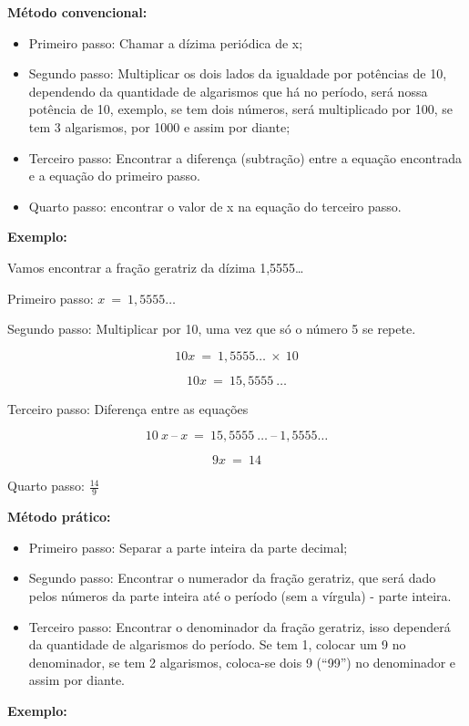 \textbf{Método convencional:}

\begin{itemize}
\item
  Primeiro passo: Chamar a dízima periódica de x;
\item
  Segundo passo: Multiplicar os dois lados da igualdade por potências de
  10, dependendo da quantidade de algarismos que há no período, será
  nossa potência de 10, exemplo, se tem dois números, será multiplicado
  por 100, se tem 3 algarismos, por 1000 e assim por diante;
\item
  Terceiro passo: Encontrar a diferença (subtração) entre a equação
  encontrada e a equação do primeiro passo.
\item
  Quarto passo: encontrar o valor de x na equação do terceiro passo.
\end{itemize}

\textbf{Exemplo:}

Vamos encontrar a fração geratriz da dízima 1,5555\ldots{}

Primeiro passo: \(x\  = \ 1,5555\ldots\)

Segundo passo: Multiplicar por 10, uma vez que só o número 5 se repete.

\[10x\  = \ 1,5555\ldots\  \times \ 10\]

\[10x\  = \ 15,5555\ \ldots\]

Terceiro passo: Diferença entre as equações

\[10\ x\ –\ x\  = \ 15,5555\ \ldots\ –\ 1,5555\ldots\]

\[9x\  = \ 14\]

Quarto passo: \(\frac{14}{9}\)

\textbf{Método prático:}

\begin{itemize}
\item
  Primeiro passo: Separar a parte inteira da parte decimal;
\item
  Segundo passo: Encontrar o numerador da fração geratriz, que será dado
  pelos números da parte inteira até o período (sem a vírgula) - parte
  inteira.
\item
  Terceiro passo: Encontrar o denominador da fração geratriz, isso
  dependerá da quantidade de algarismos do período. Se tem 1, colocar um
  9 no denominador, se tem 2 algarismos, coloca-se dois 9 (``99'') no
  denominador e assim por diante.
\end{itemize}

\textbf{Exemplo:}

